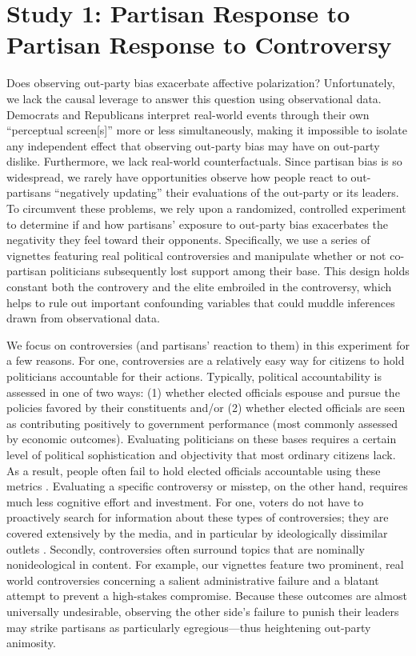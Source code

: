 \documentclass[12pt, letterpaper]{article}
\begin{document}
\section*{Study 1: Partisan Response to Partisan Response to Controversy}

Does observing out-party bias exacerbate affective polarization? Unfortunately, we lack the causal leverage to answer this question using observational data. Democrats and Republicans interpret real-world events through their own ``perceptual screen[s]'' \citep{campbell1960} more or less simultaneously, making it impossible to isolate any independent effect that observing out-party bias may have on out-party dislike. Furthermore, we lack real-world counterfactuals. Since partisan bias is so widespread, we rarely have opportunities observe how people react to out-partisans ``negatively updating'' their evaluations of the out-party or its leaders. To circumvent these problems, we rely upon a randomized, controlled experiment to determine if and how partisans' exposure to out-party bias exacerbates the negativity they feel toward their opponents. Specifically, we use a series of vignettes featuring real political controversies and manipulate whether or not co-partisan politicians subsequently lost support among their base. This design holds constant both the controvery and the elite embroiled in the controversy, which helps to rule out important confounding variables that could muddle inferences drawn from observational data. 

We focus on controversies (and partisans' reaction to them) in this experiment for a few reasons. For one, controversies are a relatively easy way for citizens to hold politicians accountable for their actions. Typically, political accountability is assessed in one of two ways:  (1) whether elected officials espouse and pursue the policies favored by their constituents and/or (2) whether elected officials are seen as contributing positively to government performance (most commonly assessed by economic outcomes). Evaluating politicians on these bases requires a certain level of political sophistication and objectivity that most ordinary citizens lack. As a result, people often fail to hold elected officials accountable using these metrics \citep[e.g.,][]{achen2016democracy,Bartels2008,healylenz_2014,Lenz2012,snidermanstiglitz_2012,soodiyengar_2014}. Evaluating a specific controversy or misstep, on the other hand, requires much less cognitive effort and investment. For one, voters do not have to proactively search for information about these types of controversies; they are covered extensively by the media, and in particular by ideologically dissimilar outlets \citep{budaketal_2016,puglisisnyder_2011}. Secondly, controversies often surround topics that are nominally nonideological in content. For example, our vignettes feature two prominent, real world controversies concerning a salient administrative failure and a blatant attempt to prevent a high-stakes compromise. Because these outcomes are almost universally undesirable, observing the other side's failure to punish their leaders may strike partisans as particularly egregious---thus heightening out-party animosity. 
\end{document}
